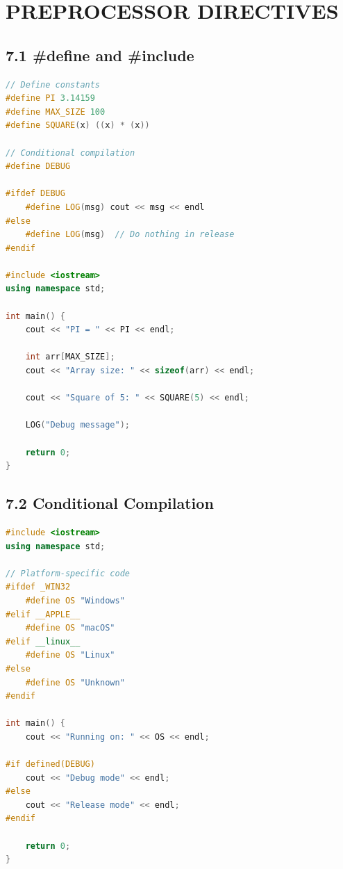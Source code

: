 \hypertarget{preprocessor-directives}{%
\chapter{PREPROCESSOR DIRECTIVES}\label{preprocessor-directives}}

\hypertarget{define-and-include}{%
\section{7.1 \#define and \#include}\label{define-and-include}}

\begin{lstlisting}[language={C++}]
// Define constants
#define PI 3.14159
#define MAX_SIZE 100
#define SQUARE(x) ((x) * (x))

// Conditional compilation
#define DEBUG

#ifdef DEBUG
    #define LOG(msg) cout << msg << endl
#else
    #define LOG(msg)  // Do nothing in release
#endif

#include <iostream>
using namespace std;

int main() {
    cout << "PI = " << PI << endl;
    
    int arr[MAX_SIZE];
    cout << "Array size: " << sizeof(arr) << endl;
    
    cout << "Square of 5: " << SQUARE(5) << endl;
    
    LOG("Debug message");
    
    return 0;
}
\end{lstlisting}

\hypertarget{conditional-compilation}{%
\section{7.2 Conditional Compilation}\label{conditional-compilation}}

\begin{lstlisting}[language={C++}]
#include <iostream>
using namespace std;

// Platform-specific code
#ifdef _WIN32
    #define OS "Windows"
#elif __APPLE__
    #define OS "macOS"
#elif __linux__
    #define OS "Linux"
#else
    #define OS "Unknown"
#endif

int main() {
    cout << "Running on: " << OS << endl;
    
#if defined(DEBUG)
    cout << "Debug mode" << endl;
#else
    cout << "Release mode" << endl;
#endif
    
    return 0;
}
\end{lstlisting}

